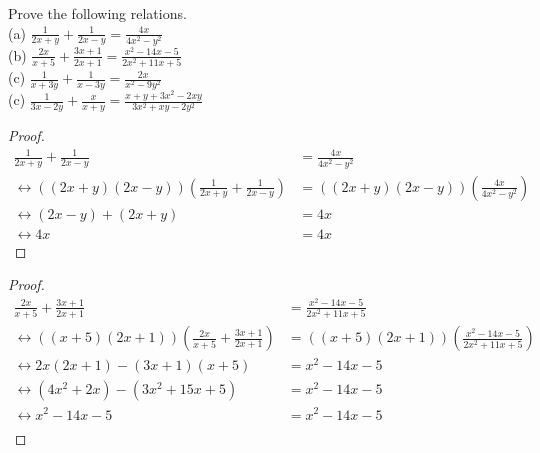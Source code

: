 \documentclass[6pt]{article}
\begin{document}
\begin{tcolorbox}[title=Problem 3, breakable]
Prove the following relations. \\
(a) $\frac{1}{2x + y} + \frac{1}{2x - y} = \frac{4x}{4x^2 - y^2}$ \\
(b) $\frac{2x}{x + 5} + \frac{3x + 1}{2x + 1} = \frac{x^2 - 14x - 5}{2x^2 + 11x + 5}$ \\
(c) $\frac{1}{x + 3y} + \frac{1}{x - 3y} = \frac{2x}{x^2 - 9y^2}$ \\
(c) $\frac{1}{3x - 2y} + \frac{x}{x + y} = \frac{x + y + 3x^2 - 2xy}{3x^2 + xy - 2y^2}$
\end{tcolorbox}

\begin{proof}
\begin{align*}
\frac{1}{2x + y} + \frac{1}{2x - y} &= \frac{4x}{4x^2 - y^2} && \\
\leftrightarrow \left((2x + y)(2x - y)\right)\left(\frac{1}{2x + y} + \frac{1}{2x - y}\right) 
    &= \left((2x + y)(2x - y)\right)\left(\frac{4x}{4x^2 - y^2}\right) && \\
\leftrightarrow (2x - y) + (2x + y) &= 4x && \\
\leftrightarrow 4x &= 4x 
\end{align*}
\end{proof}
\begin{proof}
\begin{align*}
\frac{2x}{x + 5} + \frac{3x + 1}{2x + 1} &= \frac{x^2 - 14x - 5}{2x^2 + 11x + 5} && \\
\leftrightarrow \left((x + 5)(2x + 1)\right)\left(\frac{2x}{x + 5} + \frac{3x + 1}{2x + 1}\right)
    &= \left((x + 5)(2x + 1)\right)\left(\frac{x^2 - 14x - 5}{2x^2 + 11x + 5}\right) && \\
\leftrightarrow 2x(2x + 1) - (3x + 1)(x + 5) &= x^2 - 14x - 5 && \\
\leftrightarrow (4x^2 + 2x) - (3x^2 + 15x + 5) &= x^2 - 14x - 5 && \\
\leftrightarrow x^2 - 14x - 5 &= x^2 - 14x - 5 && \\
\end{align*}
\end{proof}
\end{document}
